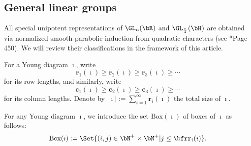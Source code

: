\documentclass[12pt,a4paper]{amsart}
\def\subset{\subseteq}
\def\abs#1{\left|{#1}\right|}
\numberwithin{equation}{section}
\theoremstyle{remark}
\begin{document}
\subsection{General linear groups}\label{sec:GLRH}


All special unipotent representations of $\GL_n(\bR)$ and $\GL_{\frac{n}{2}}(\bH)$  are obtained via normalized smooth parabolic induction from quadratic characters (see \cite{V.GL}*{Page 450}).
We will review their classifications in the framework of this article.


  For a Young diagram $\imath$, write
 \[
   \mathbf r_1(\imath)\geq \mathbf r_2(\imath)\geq \mathbf r_3(\imath)\geq \cdots
 \]
 for its row lengths, and similarly, write
 \[
   \mathbf c_1(\imath)\geq \mathbf c_2(\imath)\geq \mathbf c_3(\imath)\geq \cdots
 \]
 for its column lengths. Denote by
 $\abs{\imath}:=\sum_{i=1}^\infty \mathbf r_i(\imath)$ the total size of
 $\imath$.

For any Young diagram $\imath$, we introduce the set $\mathrm{Box}(\imath)$ of
boxes of $\imath$ %
as follows: 
\[
  \mathrm{Box}(\imath):=\Set{(i,j)\in\bN^+\times \bN^+| j\leq \bfrr_i(\imath)}.
\]


\end{document}
